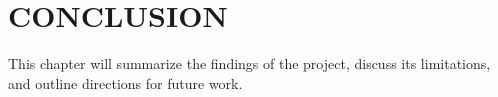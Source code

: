 \chapter{CONCLUSION}


This chapter will summarize the findings of the project, discuss its limitations, and outline directions for future work.
